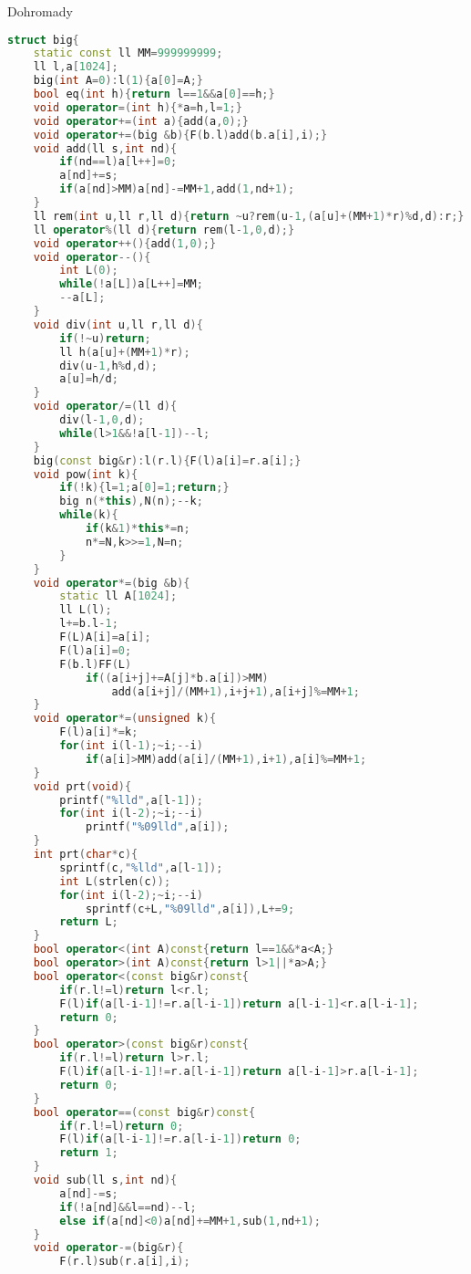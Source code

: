 \documentclass[11pt]{article}
\begin{document}
Dohromady
\begin{lstlisting}[language=C++]
struct big{
    static const ll MM=999999999;
    ll l,a[1024];
    big(int A=0):l(1){a[0]=A;}
    bool eq(int h){return l==1&&a[0]==h;}
    void operator=(int h){*a=h,l=1;}
    void operator+=(int a){add(a,0);}
    void operator+=(big &b){F(b.l)add(b.a[i],i);}
    void add(ll s,int nd){
        if(nd==l)a[l++]=0;
        a[nd]+=s;
        if(a[nd]>MM)a[nd]-=MM+1,add(1,nd+1);
    }
    ll rem(int u,ll r,ll d){return ~u?rem(u-1,(a[u]+(MM+1)*r)%d,d):r;}
    ll operator%(ll d){return rem(l-1,0,d);}
    void operator++(){add(1,0);}
    void operator--(){
        int L(0);
        while(!a[L])a[L++]=MM;
        --a[L];
    }
    void div(int u,ll r,ll d){
        if(!~u)return;
        ll h(a[u]+(MM+1)*r);
        div(u-1,h%d,d);
        a[u]=h/d;
    }
    void operator/=(ll d){
        div(l-1,0,d);
        while(l>1&&!a[l-1])--l;
    }
    big(const big&r):l(r.l){F(l)a[i]=r.a[i];}
    void pow(int k){
        if(!k){l=1;a[0]=1;return;}
        big n(*this),N(n);--k;
        while(k){
            if(k&1)*this*=n;
            n*=N,k>>=1,N=n;
        }
    }
    void operator*=(big &b){
        static ll A[1024];
        ll L(l);
        l+=b.l-1;
        F(L)A[i]=a[i];
        F(l)a[i]=0;
        F(b.l)FF(L)
            if((a[i+j]+=A[j]*b.a[i])>MM)
                add(a[i+j]/(MM+1),i+j+1),a[i+j]%=MM+1;
    }
    void operator*=(unsigned k){
        F(l)a[i]*=k;
        for(int i(l-1);~i;--i)
            if(a[i]>MM)add(a[i]/(MM+1),i+1),a[i]%=MM+1;
    }
    void prt(void){
        printf("%lld",a[l-1]);
        for(int i(l-2);~i;--i)
            printf("%09lld",a[i]);
    }
    int prt(char*c){
        sprintf(c,"%lld",a[l-1]);
        int L(strlen(c));
        for(int i(l-2);~i;--i)
            sprintf(c+L,"%09lld",a[i]),L+=9;
        return L;
    }
    bool operator<(int A)const{return l==1&&*a<A;}
    bool operator>(int A)const{return l>1||*a>A;}
    bool operator<(const big&r)const{
        if(r.l!=l)return l<r.l;
        F(l)if(a[l-i-1]!=r.a[l-i-1])return a[l-i-1]<r.a[l-i-1];
        return 0;
    }
    bool operator>(const big&r)const{
        if(r.l!=l)return l>r.l;
        F(l)if(a[l-i-1]!=r.a[l-i-1])return a[l-i-1]>r.a[l-i-1];
        return 0;
    }
    bool operator==(const big&r)const{
        if(r.l!=l)return 0;
        F(l)if(a[l-i-1]!=r.a[l-i-1])return 0;
        return 1;
    }
    void sub(ll s,int nd){
        a[nd]-=s;
        if(!a[nd]&&l==nd)--l;
        else if(a[nd]<0)a[nd]+=MM+1,sub(1,nd+1);
    }
    void operator-=(big&r){
        F(r.l)sub(r.a[i],i);    

\end{lstlisting}
\end{document}
